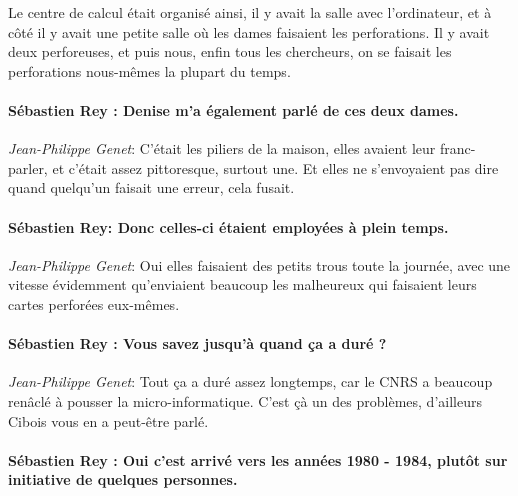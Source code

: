 Le centre de calcul était organisé ainsi, il y avait la salle avec l'ordinateur, et à côté il y avait une petite salle où les dames  faisaient les perforations. Il y avait deux perforeuses, et puis nous, enfin tous les chercheurs, on se faisait les perforations nous-mêmes la plupart du temps. 

\paragraph*{Sébastien Rey : Denise m'a également parlé de ces deux dames.}

\noindent\emph{Jean-Philippe Genet}: C'était les piliers de la maison, elles avaient leur franc-parler, et c'était assez pittoresque, surtout une. Et elles ne s'envoyaient pas dire quand quelqu'un faisait une erreur, cela fusait. 
 
\paragraph*{Sébastien Rey: Donc celles-ci étaient employées à plein temps.}

\noindent\emph{Jean-Philippe Genet}: Oui elles faisaient des petits trous toute la journée, avec une vitesse évidemment qu'enviaient beaucoup les malheureux qui faisaient leurs cartes perforées eux-mêmes.

\paragraph*{Sébastien Rey : Vous savez jusqu'à quand ça a duré ?}

\noindent\emph{Jean-Philippe Genet}: Tout ça a duré assez longtemps, car le CNRS a beaucoup renâclé à pousser la micro-informatique. C'est çà un des problèmes, d'ailleurs Cibois vous en a peut-être parlé.

\paragraph*{Sébastien Rey : Oui c'est arrivé vers les années 1980 - 1984, plutôt sur initiative de quelques personnes.}

